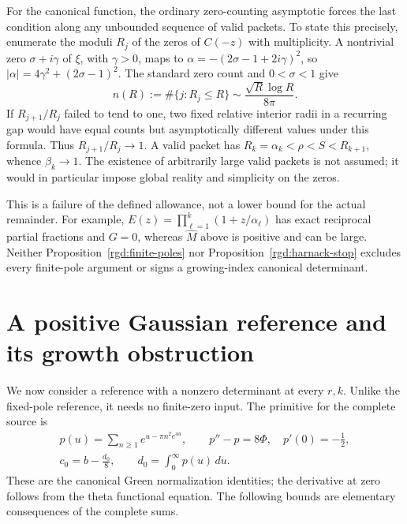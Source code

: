 For the canonical function, the ordinary zero-counting asymptotic
forces the last condition along any unbounded sequence of valid
packets.  To state this precisely, enumerate the moduli $R_j$ of the
zeros of $C(-z)$ with multiplicity.  A nontrivial zero
$\sigma+i\gamma$ of $\xi$, with $\gamma>0$, maps to
$\alpha=-(2\sigma-1+2i\gamma)^2$, so
$|\alpha|=4\gamma^2+(2\sigma-1)^2$.  The standard zero count
\cite[\S2]{Odlyzko1987AuthorCopy} and $0<\sigma<1$ give
\[
 n(R):=\#\{j:R_j\le R\}\sim\frac{\sqrt R\log R}{8\pi}.
\]
If $R_{j+1}/R_j$ failed to tend to one, two fixed relative interior
radii in a recurring gap would have equal counts but asymptotically
different values under this formula.  Thus $R_{j+1}/R_j\to1$.
A valid packet has $R_k=\alpha_k<\rho<S<R_{k+1}$, whence
$\beta_k\to1$.  The existence of arbitrarily large valid packets is
not assumed; it would in particular impose global reality and
simplicity on the zeros.

This is a failure of the defined allowance, not a lower bound for the
actual remainder.  For example,
$E(z)=\prod_{\ell=1}^k(1+z/\alpha_\ell)$ has exact reciprocal partial
fractions and $G=0$, whereas $\widehat M$ above is positive and can be
large.  Neither Proposition~\ref{rgd:finite-poles} nor
Proposition~\ref{rgd:harnack-stop} excludes every finite-pole argument
or signs a growing-index canonical determinant.

\section{A positive Gaussian reference and its growth obstruction}
\label{rgd:sec-gaussian}

We now consider a reference with a nonzero determinant at every
$r,k$.  Unlike the fixed-pole reference, it needs no finite-zero input.
The primitive for the complete source is
\[
 \begin{gathered}
 p(u)=\sum_{n\ge1}e^{u-\pi n^2e^{4u}},\qquad
 p''-p=8\Phi,\quad p'(0)=-\tfrac12,\\
 c_0=b-\frac{d_0}{8},\qquad d_0=\int_0^\infty p(u)\,du.
 \end{gathered}
\]
These are the canonical Green normalization identities; the derivative
at zero follows from the theta functional equation.  The following
bounds are elementary consequences of the complete sums.

